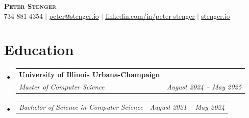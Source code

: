 \documentclass[letterpaper,11pt]{article}
\makeatletter
\newcommand{\uhref}[2]{\href{#1}{\uline{#2}}}
\newcommand{\resumeSubheading}[4]{
	\vspace{-2pt}\item
	\begin{tabular*}{0.97\textwidth}[t]{l@{\extracolsep{\fill}}r}
		\textbf{#1} & #2 \\
		\textit{\small#3} & \textit{\small #4} \\
	\end{tabular*}\vspace{-7pt}
}
\newcommand{\resumeSubSubheading}[2]{
	\item
	\begin{tabular*}{0.97\textwidth}{l@{\extracolsep{\fill}}r}
		\textit{\small#1} & \textit{\small #2} \\
	\end{tabular*}\vspace{-7pt}
}
\newcommand{\resumeSubHeadingListStart}{\begin{itemize}[leftmargin=0.15in, label={}]}
\newcommand{\resumeSubHeadingListEnd}{\end{itemize}}
\makeatother
\begin{document}
	
	\begin{center}
		\textbf{\Huge \scshape Peter Stenger} \\ \vspace{1pt}
		\small 734-881-4354 $|$ \uhref{mailto:peter@stenger.io}{peter@stenger.io} $|$ 
		\uhref{https://linkedin.com/in/peter-stenger/}{linkedin.com/in/peter-stenger} $|$
		\uhref{https://stenger.io}{stenger.io}

	\end{center}
	
	
	\section{Education}
	\resumeSubHeadingListStart
	\resumeSubheading
	{University of Illinois Urbana-Champaign}{}
 	{Master of Computer Science}{August 2024 -- May 2025}
        \resumeSubSubheading
	{Bachelor of Science in Computer Science}{August 2021 -- May 2024}
	\resumeSubHeadingListEnd

\end{document}

